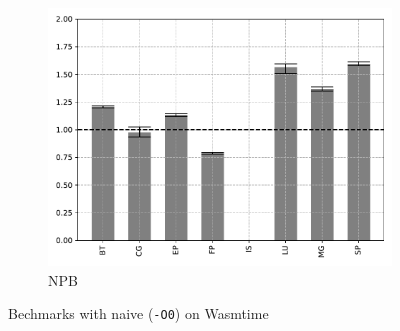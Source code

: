 \begin{figure}
\begin{subfigure}[t]{.45\textwidth}
        \includegraphics[width=\textwidth]
        {Images/6.1.RQ1/npb-wasmtime-naive.pdf}
        \caption{NPB}
    \end{subfigure}
    \caption{Bechmarks with naive (\texttt{-O0}) on Wasmtime}
\end{figure}

